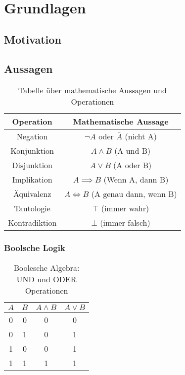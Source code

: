 \chapter{Grundlagen}

\section{Motivation}



\section{Aussagen}

\begin{table}[h!]
    \centering
    \renewcommand{\arraystretch}{1.5} %
    \begin{tabular}{|c|c|}
        \hline
        \textbf{Operation} & \textbf{Mathematische Aussage} \\
        \hline
        Negation & $\neg A$ oder $\bar A$ (nicht A) \\
        \hline
        Konjunktion & $A \land B$ (A und B) \\
        \hline
        Disjunktion & $A \lor B$ (A oder B) \\
        \hline
        Implikation & $A \implies B$ (Wenn A, dann B) \\
        \hline
        Äquivalenz & $A \iff B$ (A genau dann, wenn B) \\
        \hline
        Tautologie & $\top$ (immer wahr) \\
        \hline
        Kontradiktion & $\bot$ (immer falsch) \\
        \hline
    \end{tabular}
    \caption{Tabelle über mathematische Aussagen und Operationen}
\end{table}



\subsection{Boolsche Logik}
\label{sec:bool}

\begin{table}[h!]
    \centering
    \begin{tabular}{|c|c|c|c|}
        \hline
        $A$ & $B$ & $A \land B$ & $A \lor B$ \\
        \hline
        0 & 0 & 0 & 0 \\
        0 & 1 & 0 & 1 \\
        1 & 0 & 0 & 1 \\
        1 & 1 & 1 & 1 \\
        \hline
    \end{tabular}
    \caption{Boolesche Algebra: UND und ODER Operationen}
\end{table}

